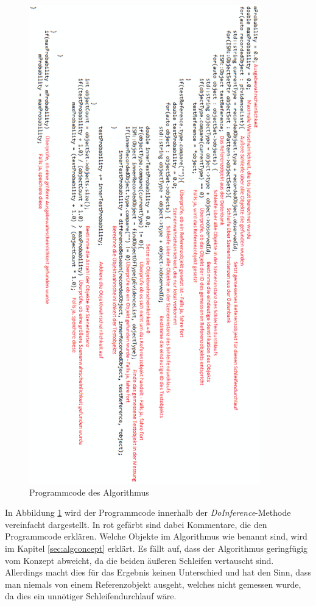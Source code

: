\begin{figure}
	\centering
	\includegraphics[width=10cm]{bilder/ProgrammcodeKommentiert.pdf}
	\caption{Programmcode des Algorithmus}
	\label{img:programcode}
\end{figure}
In Abbildung \ref{img:programcode} wird der Programmcode innerhalb der \textit{DoInference}-Methode vereinfacht dargestellt. In rot gefärbt sind dabei Kommentare, die den Programmcode erklären. Welche Objekte im Algorithmus wie benannt sind, wird im Kapitel \ref{sec:algconcept} erklärt. Es fällt auf, dass der Algorithmus geringfügig vom Konzept abweicht, da die beiden äußeren Schleifen vertauscht sind. Allerdings macht dies für das Ergebnis keinen Unterschied und hat den Sinn, dass man niemals von einem Referenzobjekt ausgeht, welches nicht gemessen wurde, da dies ein unnötiger Schleifendurchlauf wäre.
